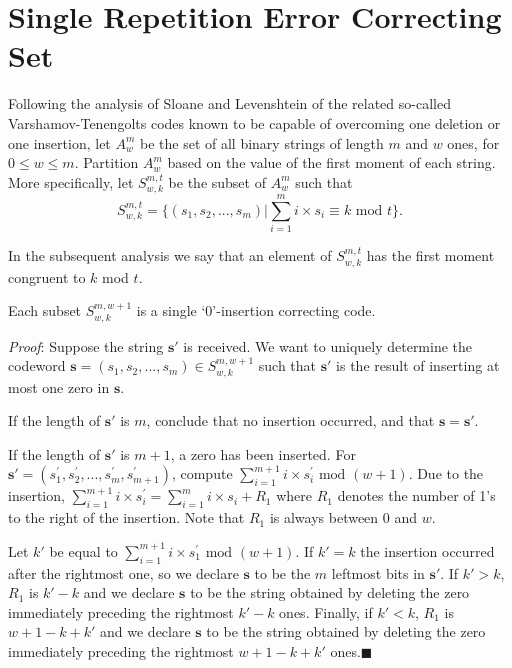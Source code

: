 \section{Single Repetition Error Correcting Set}\label{one}
Following the analysis of Sloane \cite{sloane:00} and Levenshtein
\cite{lev:66} of the related so-called Varshamov-Tenengolts codes
\cite{vt:65} known to be capable of overcoming one deletion or one
insertion, let $A_w^m$ be the set of all binary strings of length
$m$ and $w$ ones, for $0 \leq w \leq m$. Partition $A_w^m$ based on
the value of the first moment of each string. More specifically, let
$S_{w,k}^{m,t}$ be the subset of $A_w^m$ such that
\begin{equation}\label{s1f}S_{w,k}^{m,t}=\{(s_1,s_2,...,s_m)| \sum_{i=1}^m
i \times s_i \equiv k \text{ mod } t\}.\end{equation}

In the subsequent analysis we say that an element of $S_{w,k}^{m,t}$
has the first moment congruent to $k$ mod $t$.

\begin{lemma}Each subset $S_{w,k}^{m,w+1}$ is a single `0'-insertion correcting
code.\end{lemma} \textit{Proof}: Suppose the string $\mathbf{s'}$ is
received. We want to uniquely determine the codeword
$\mathbf{s}=(s_1,s_2,...,s_m) \in S_{w,k}^{m,w+1}$ such that
$\mathbf{s'}$ is the result of inserting at most one zero in
$\mathbf{s}$.

If the length of $\mathbf{s'}$ is $m$, conclude that no insertion
occurred, and that $\mathbf{s}=\mathbf{s'}$.

If the length of $\mathbf{s'}$ is $m+1$, a zero has been inserted.
For $\mathbf{s'}=(s_1^{'},s_2^{'},...,s_m^{'},s_{m+1}^{'})$, compute
$\sum_{i=1}^{m+1} i \times s_i^{'} \text{ mod } (w+1)$. Due to the
insertion, $\sum_{i=1}^{m+1} i \times s_i^{'}= \sum_{i=1}^{m} i
\times s_i + R_1$ where $R_1$ denotes the number of 1's to the right
of the insertion. Note that $R_1$ is always between $0$ and $w$.

Let $k'$ be equal to $\sum_{i=1}^{m+1} i \times s_1^{'} \text{ mod }
(w+1)$. If $k'=k$ the insertion occurred after the rightmost one, so
we declare $\mathbf{s}$ to be the $m$ leftmost bits in
$\mathbf{s'}$. If $k'>k$, $R_1$ is $k'-k$ and  we declare
$\mathbf{s}$ to be the string obtained by deleting the zero
immediately preceding the rightmost $k'-k$ ones.  Finally, if $k'<
k$, $R_1$ is $w+1-k+k'$ and we declare $\mathbf{s}$ to be the string
obtained by deleting the zero immediately preceding the rightmost
$w+1-k+k'$ ones.\hfill$\blacksquare$

